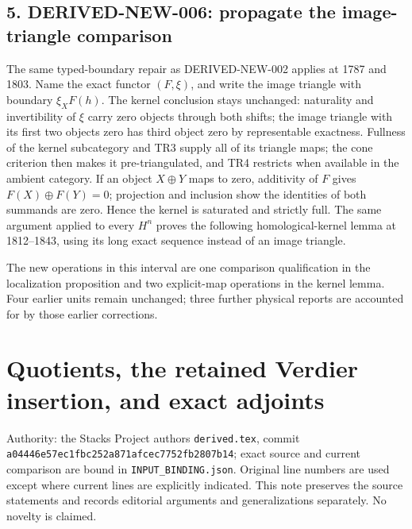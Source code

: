 \documentclass[11pt]{article}
\begin{document}
\subsection{\texorpdfstring{5. DERIVED-NEW-006:\allowbreak{} propagate the image-triangle comparison}{5.  propagate the image-triangle comparison}}\label{proofs-1149-1843-derived-new-006-propagate-the-image-triangle-comparison}

The same typed-boundary repair as DERIVED-NEW-002 applies at 1787 and 1803. Name the exact functor \((F,\xi)\),\allowbreak{} and write the image triangle with boundary \(\xi_XF(h)\). The kernel conclusion stays unchanged:\allowbreak{} naturality and invertibility of \(\xi\) carry zero objects through both shifts; the image triangle with its first two objects zero has third object zero by representable exactness. Fullness of the kernel subcategory and TR3 supply all of its triangle maps; the cone criterion then makes it pre-triangulated,\allowbreak{} and TR4 restricts when available in the ambient category. If an object \(X\oplus Y\) maps to zero,\allowbreak{} additivity of \(F\) gives \(F(X)\oplus F(Y)=0\); projection and inclusion show the identities of both summands are zero. Hence the kernel is saturated and strictly full. The same argument applied to every \(H^n\) proves the following homological-kernel lemma at 1812–\allowbreak{}1843,\allowbreak{} using its long exact sequence instead of an image triangle.

The new operations in this interval are one comparison qualification in the localization proposition and two explicit-map operations in the kernel lemma. Four earlier units remain unchanged; three further physical reports are accounted for by those earlier corrections.
\clearpage
\section{\texorpdfstring{Quotients,\allowbreak{} the retained Verdier insertion,\allowbreak{} and exact adjoints}{ the retained Verdier  and exact adjoints}}\label{proofs-1844-2401-quotients-the-retained-verdier-insertion-and-exact-adjoints}

Authority:\allowbreak{} the Stacks Project authors\textquotesingle{} \texttt{derived.\allowbreak{}tex},\allowbreak{} commit \texttt{a04446e5\allowbreak{}7ec1fbc2\allowbreak{}52a871af\allowbreak{}cec7752f\allowbreak{}b2807b14}; exact source and current comparison are bound in \texttt{INPUT\_\allowbreak{}BINDING.\allowbreak{}json}. Original line numbers are used except where current lines are explicitly indicated. This note preserves the source statements and records editorial arguments and generalizations separately. No novelty is claimed.
\end{document}
